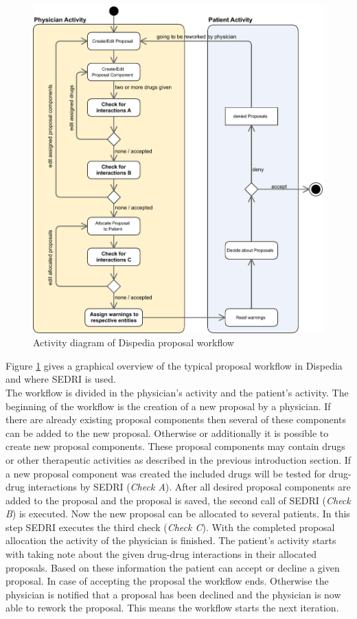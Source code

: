 \begin{figure}
  \centering
  \includegraphics[scale=0.49]{evaluation/Dispedia_Integration_activity.pdf}
  \caption{Activity diagram of Dispedia proposal workflow}
  \label{fig:dispedia_activity}
\end{figure}
Figure \ref{fig:dispedia_activity} gives a graphical overview of the typical proposal workflow in Dispedia and where SEDRI is used.\\
The workflow is divided in the physician's activity and the patient's activity.
The beginning of the workflow is the creation of a new proposal by a physician.
If there are already existing proposal components then several of these components can be added to the new proposal.
Otherwise or additionally it is possible to create new proposal components.
These proposal components may contain drugs or other therapeutic activities as described in the previous introduction section.
If a new proposal component was created the included drugs will be tested for drug-drug interactions by SEDRI (\textit{Check A}).
After all desired proposal components are added to the proposal and the proposal is saved, the second call of SEDRI (\textit{Check B}) is executed.
Now the new proposal can be allocated to several patients.
In this step SEDRI executes the third check (\textit{Check C}).
With the completed proposal allocation the activity of the physician is finished.
The patient's activity starts with taking note about the given drug-drug interactions in their allocated proposals.
Based on these information the patient can accept or decline a given proposal.
In case of accepting the proposal the workflow ends.
Otherwise the physician is notified that a proposal has been declined and the physician is now able to rework the proposal.
This means the workflow starts the next iteration.

